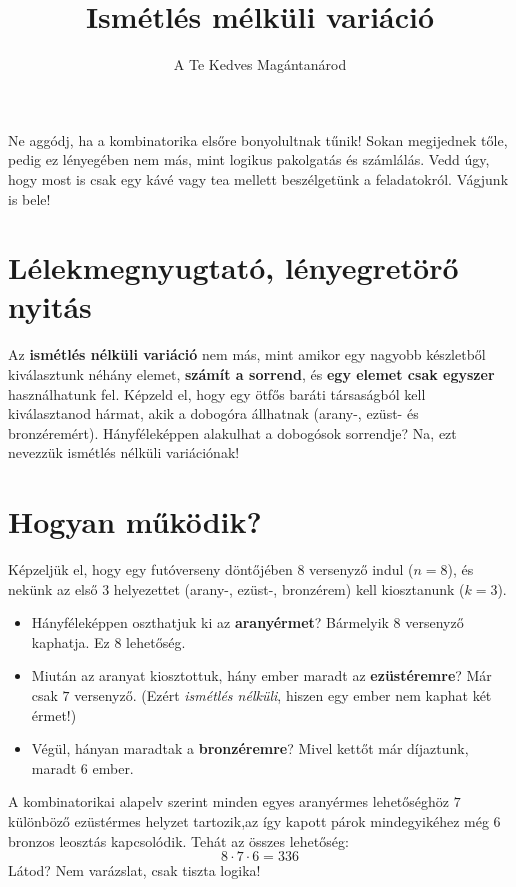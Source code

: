 \documentclass[11pt,a4paper]{article}
\title{Ismétlés mélküli variáció}
\author{A Te Kedves Magántanárod}
\date{}
\begin{document}
\maketitle

\begin{tcolorbox}[colback=mysecondary,colframe=myprimary,arc=4pt,title=\textbf{Üdvözöllek, Kedves Diákum!}]
Ne aggódj, ha a kombinatorika elsőre bonyolultnak tűnik! Sokan megijednek tőle, pedig ez lényegében nem más, mint logikus pakolgatás és számlálás. Vedd úgy, hogy most is csak egy kávé vagy tea mellett beszélgetünk a feladatokról. Vágjunk is bele!
\end{tcolorbox}

\section{Lélekmegnyugtató, lényegretörő nyitás}
Az \textbf{ismétlés nélküli variáció} nem más, mint amikor egy nagyobb készletből kiválasztunk néhány elemet, \textbf{számít a sorrend}, és \textbf{egy elemet csak egyszer} használhatunk fel. Képzeld el, hogy egy ötfős baráti társaságból kell kiválasztanod hármat, akik a dobogóra állhatnak (arany-, ezüst- és bronzéremért). Hányféleképpen alakulhat a dobogósok sorrendje? Na, ezt nevezzük ismétlés nélküli variációnak!

\section{Hogyan működik?}
Képzeljük el, hogy egy futóverseny döntőjében 8 versenyző indul ($n = 8$), és nekünk az első 3 helyezettet (arany-, ezüst-, bronzérem) kell kiosztanunk ($k = 3$). 

\begin{itemize}
    \item Hányféleképpen oszthatjuk ki az \textbf{aranyérmet}? Bármelyik 8 versenyző kaphatja. Ez $8$ lehetőség.
    \item Miután az aranyat kiosztottuk, hány ember maradt az \textbf{ezüstéremre}? Már csak $7$ versenyző. (Ezért \emph{ismétlés nélküli}, hiszen egy ember nem kaphat két érmet!)
    \item Végül, hányan maradtak a \textbf{bronzéremre}? Mivel kettőt már díjaztunk, maradt $6$ ember.
\end{itemize}

A kombinatorikai alapelv szerint minden egyes aranyérmes lehetőséghöz $7$ különböző ezüstérmes helyzet tartozik,az így kapott párok mindegyikéhez még $6$ bronzos leosztás kapcsolódik. Tehát az összes lehetőség:
\[ 8 \cdot 7 \cdot 6 = 336 \]
Látod? Nem varázslat, csak tiszta logika!
\end{document}
